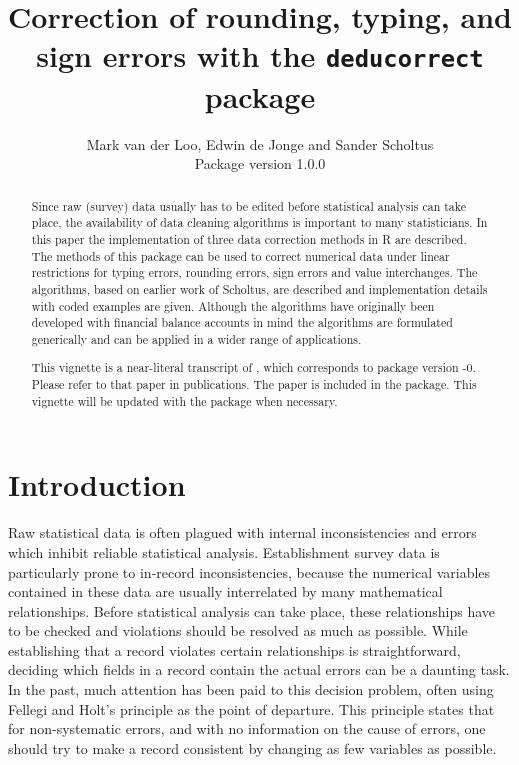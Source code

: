 \documentclass[11pt, fleqn, a4paper]{article}
\title{Correction of rounding, typing, and sign errors with the {\tt deducorrect} package}
\author{Mark van der Loo, Edwin de Jonge and Sander Scholtus\\
{\small Package version 1.0.0}}
\begin{document}
\maketitle
\begin{abstract}

Since raw (survey) data usually has to be edited before statistical analysis
can take place, the availability of data cleaning algorithms is important to
many statisticians.  In this paper the implementation of three data correction
methods in R are described. The methods of this package can be used to correct
numerical data under linear restrictions for typing errors, rounding errors,
sign errors and value interchanges. The algorithms, based on earlier work of
Scholtus, are described and implementation details with coded examples are given.
Although the algorithms have originally been developed with financial balance
accounts in mind the algorithms are formulated generically and can be applied
in a wider range of applications.

This vignette is a near-literal transcript of \cite{loo:2011a}, which corresponds to
package version {-0}. Please refer to that paper in publications. The paper
is included in the package. This vignette will be updated with the package when necessary.

\end{abstract}

\maketitle

\newpage

\tableofcontents
\listofalgorithms
\newpage
\section{Introduction}
Raw statistical data  is often plagued with internal inconsistencies and errors
which inhibit reliable statistical analysis. Establishment survey data is
particularly prone to in-record inconsistencies, because the numerical
variables contained in these data are usually interrelated by many mathematical
relationships. Before statistical analysis can take place, these relationships
have to be checked and violations should be resolved as much as possible.
While establishing that a record violates certain relationships is
straightforward, deciding which fields in a record contain the actual errors
can be a daunting task. In the past, much attention has been paid to this
decision problem, often using Fellegi and Holt's principle \citep{fellegi:1976}
as the point of departure. This principle states that for non-systematic errors, and
with no information on the cause of errors, one should try to make a record
consistent by changing as few variables as possible.
\end{document}
